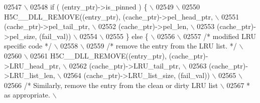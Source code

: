\begin{DoxyCode}
02547 \textcolor{preprocessor}{                                      \(\backslash\)}
02548 \textcolor{preprocessor}{    if ( (entry\_ptr)->is\_pinned ) \{                                       \(\backslash\)}
02549 \textcolor{preprocessor}{                                                                          \(\backslash\)}
02550 \textcolor{preprocessor}{        H5C\_\_DLL\_REMOVE((entry\_ptr), (cache\_ptr)->pel\_head\_ptr,           \(\backslash\)}
02551 \textcolor{preprocessor}{                        (cache\_ptr)->pel\_tail\_ptr,            \(\backslash\)}
02552 \textcolor{preprocessor}{            (cache\_ptr)->pel\_len,                             \(\backslash\)}
02553 \textcolor{preprocessor}{                        (cache\_ptr)->pel\_size, (fail\_val))                \(\backslash\)}
02554 \textcolor{preprocessor}{                                                                          \(\backslash\)}
02555 \textcolor{preprocessor}{    \} else \{                                                              \(\backslash\)}
02556 \textcolor{preprocessor}{                                                                          \(\backslash\)}
02557 \textcolor{preprocessor}{        }\textcolor{comment}{/* modified LRU specific code */}\textcolor{preprocessor}{                                  \(\backslash\)}
02558 \textcolor{preprocessor}{                                                                          \(\backslash\)}
02559 \textcolor{preprocessor}{        }\textcolor{comment}{/* remove the entry from the LRU list. */}\textcolor{preprocessor}{                         \(\backslash\)}
02560 \textcolor{preprocessor}{                                                                          \(\backslash\)}
02561 \textcolor{preprocessor}{        H5C\_\_DLL\_REMOVE((entry\_ptr), (cache\_ptr)->LRU\_head\_ptr,           \(\backslash\)}
02562 \textcolor{preprocessor}{                        (cache\_ptr)->LRU\_tail\_ptr,                        \(\backslash\)}
02563 \textcolor{preprocessor}{            (cache\_ptr)->LRU\_list\_len,                        \(\backslash\)}
02564 \textcolor{preprocessor}{                        (cache\_ptr)->LRU\_list\_size, (fail\_val))           \(\backslash\)}
02565 \textcolor{preprocessor}{                                                                          \(\backslash\)}
02566 \textcolor{preprocessor}{        }\textcolor{comment}{/* Similarly, remove the entry from the clean or dirty LRU list   \(\backslash\)}
02567 \textcolor{comment}{         * as appropriate.                                                \(\backslash\)}

\end{DoxyCode}
